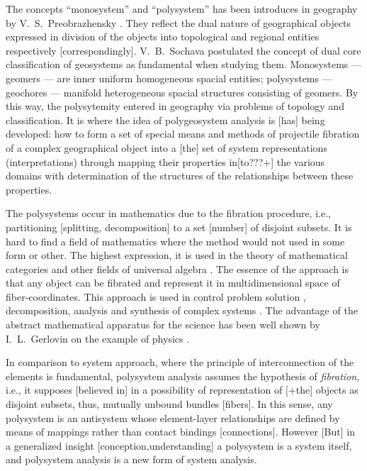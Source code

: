 \documentclass[12pt,leqno]{book}
\numberwithin{equation}{chapter}
\begin{document}
The concepts ``monosystem'' and ``polysystem'' has been introduces in geography by V.~S.~Preobrazhensky \cite{b338}. They reflect the dual nature of geographical objects expressed in division of the objects into topological and regional entities respectively [correspondingly]. V.~B.~Sochava \cite{b398, b399} postulated the concept of dual core classification of geosystems as fundamental when studying them. Monosystems --- geomers --- are inner uniform homogeneous spacial entities; polysystems --- geochores --- manifold heterogeneous spacial structures consisting of geomers. By this way, the polysytemity entered in geography via problems of topology and classification. It is where the idea of polygeosystem analysis is [has] being developed: how to form a set of special means and methods of projectile fibration of a complex geographical object into a [the] set of system representations (interpretations) through mapping their properties in[to???+] the various domains with determination of the structures of the relationships between these properties.

The polysystems occur in mathematics due to the fibration procedure, i.e., partitioning [splitting, decomposition] to a set [number] of disjoint subsets. It is hard to find a field of mathematics where the method would not used in some form or other. The highest expression, it is used in the theory of mathematical categories and other fields of universal algebra \cite{b57, b123, b325, b335}. The essence of the approach is that any object can be fibrated and represent it in multidimensional space of fiber-coordinates. This approach is used in control problem solution \cite{b11, b12, b252}, decomposition, analysis and synthesis of complex systems \cite{b391}. The advantage of the abstract mathematical apparatus for the science has been well shown by I.~L.~Gerlovin on the example of physics \cite{b104}.

In comparison to system approach, where the principle of interconnection of the elements is fundamental, polysystem analysis assumes the hypothesis of \emph{fibration}, i.e., it supposes [believed in] in a possibility of representation of [+the] objects as disjoint subsets, thus, mutually unbound bundles [fibers]. In this sense, any polysystem is an antisystem whose element-layer relationships are defined by means of mappings rather than contact bindings [connections]. However [But] in a generalized insight [conception,understanding] a polysystem is a system itself, and polysystem analysis is a new form of system analysis.
\end{document}

